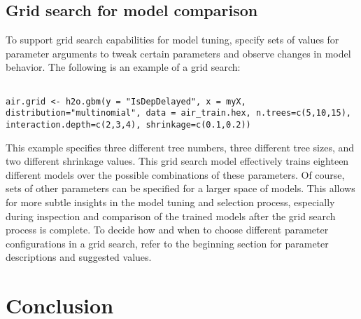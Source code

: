 \documentclass{article}[11pt]
\begin{document}
{\subsection{Grid search for model comparison} 

To support grid search capabilities for model tuning,  specify sets of values for parameter arguments to tweak certain parameters and observe changes in model behavior. The following is an example of a grid search:

\begin{lstlisting}[breaklines,basicstyle=\ttfamily]

air.grid <- h2o.gbm(y = "IsDepDelayed", x = myX, distribution="multinomial", data = air_train.hex, n.trees=c(5,10,15), interaction.depth=c(2,3,4), shrinkage=c(0.1,0.2))

\end{lstlisting}
\noindent
This example specifies three different tree numbers, three different tree sizes, and two different shrinkage values. This grid search model effectively trains eighteen different models over the possible combinations of these parameters. Of course, sets of other parameters can be specified for a larger space of models. This allows for more subtle insights in the model tuning and selection process, especially during inspection and comparison of the trained models after the grid search process is complete. To decide how and when to choose different parameter configurations in a grid search, refer to the beginning section for parameter descriptions and suggested values.


\section{Conclusion}

}
\end{document}
